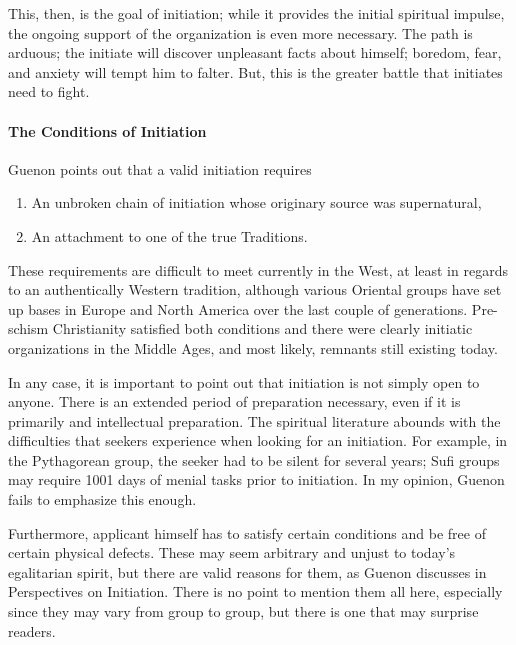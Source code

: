 This, then, is the goal of initiation; while it provides the initial spiritual impulse, the ongoing support of the organization is even more necessary. The path is arduous; the initiate will discover unpleasant facts about himself; boredom, fear, and anxiety will tempt him to falter. But, this is the greater battle that initiates need to fight.

\paragraph{The Conditions of Initiation}


Guenon points out that a valid initiation requires

\begin{enumerate}


\item An unbroken chain of initiation whose originary source was supernatural,

\item An attachment to one of the true Traditions.
\end{enumerate}


These requirements are difficult to meet currently in the West, at least in regards to an authentically Western tradition, although various Oriental groups have set up bases in Europe and North America over the last couple of generations. Pre-schism Christianity satisfied both conditions and there were clearly initiatic organizations in the Middle Ages, and most likely, remnants still existing today.

In any case, it is important to point out that initiation is not simply open to anyone. There is an extended period of preparation necessary, even if it is primarily and intellectual preparation. The spiritual literature abounds with the difficulties that seekers experience when looking for an initiation. For example, in the Pythagorean group, the seeker had to be silent for several years; Sufi groups may require 1001 days of menial tasks prior to initiation. In my opinion, Guenon fails to emphasize this enough.

Furthermore, applicant himself has to satisfy certain conditions and be free of certain physical defects. These may seem arbitrary and unjust to today's egalitarian spirit, but there are valid reasons for them, as Guenon discusses in Perspectives on Initiation. There is no point to mention them all here, especially since they may vary from group to group, but there is one that may surprise readers.

